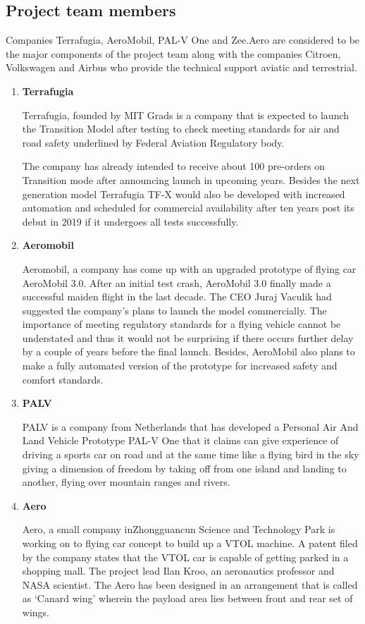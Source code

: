 \subsection{Project team members}

Companies Terrafugia, AeroMobil, PAL-V One and Zee.Aero are considered to be the major components of the project team along with the companies Citroen, Volkswagen and Airbus who provide the technical support aviatic and terrestrial.

\begin{enumerate}

\item \textbf{Terrafugia}

Terrafugia, founded by MIT Grads is a company that is expected to launch the Transition Model after testing to check meeting standards for air and road safety underlined by Federal Aviation Regulatory body.

The company has already intended to receive about 100 pre-orders on Transition mode after announcing launch in upcoming years. Besides the next generation model Terrafugia TF-X would also be developed with increased automation and scheduled for commercial availability after ten years post its debut in 2019 if it undergoes all tests successfully.

\item \textbf{Aeromobil}

Aeromobil, a company has come up with an upgraded prototype of flying car AeroMobil 3.0. After an initial test crash, AeroMobil 3.0 finally made a successful maiden flight in the last decade. The CEO Juraj Vaculik had suggested the company’s plans to launch the model commercially. The importance of meeting regulatory standards for a flying vehicle cannot be understated and thus it would not be surprising if there occurs further delay by a couple of years before the final launch. Besides, AeroMobil also plans to make a fully automated version of the prototype for increased safety and comfort standards.

\item \textbf{PALV}

PALV is a company from Netherlands that has developed a Personal Air And Land Vehicle Prototype PAL-V One that it claims can give experience of driving a sports car on road and at the same time like a flying bird in the sky giving a dimension of freedom by taking off from one island and landing to another, flying over  mountain ranges and rivers.

\item \textbf{Aero}

Aero, a small company inZhongguancun Science and Technology Park is working on to flying car concept to build up a VTOL machine. A patent filed by the company states that the VTOL car is capable of getting parked in a shopping mall. The project lead Ilan Kroo, an aeronautics professor and NASA scientist. The Aero has been designed in an arrangement that is called as ‘Canard wing’ wherein the payload area lies between front and rear set of wings.

\end{enumerate}

